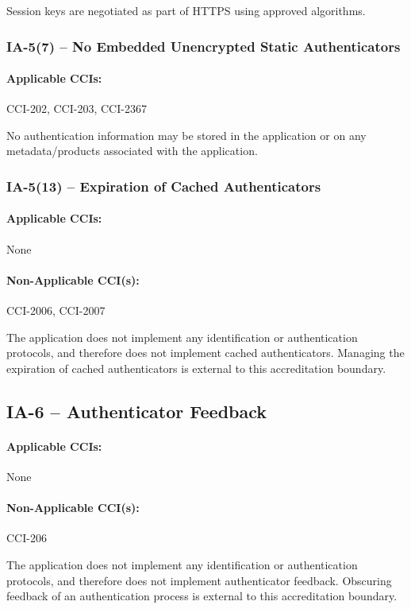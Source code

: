 \documentclass[letterpaper, 10pt, twoside]{article}
\begin{document}
Session keys are negotiated as part of HTTPS using approved algorithms.

\subsubsection{IA-5(7) -- No Embedded Unencrypted Static Authenticators}

\paragraph{Applicable CCIs:} CCI-202, CCI-203, CCI-2367

No authentication information may be stored in the application or on any metadata/products associated with the application.

\subsubsection{IA-5(13) -- Expiration of Cached Authenticators}

\paragraph{Applicable CCIs:} None

\paragraph{Non-Applicable CCI(s):} CCI-2006, CCI-2007

The application does not implement any identification or authentication protocols, and therefore does not implement cached authenticators. Managing the expiration of cached authenticators is external to this accreditation boundary.

\subsection{IA-6 -- Authenticator Feedback}

\paragraph{Applicable CCIs:} None

\paragraph{Non-Applicable CCI(s):} CCI-206

The application does not implement any identification or authentication protocols, and therefore does not implement authenticator feedback. Obscuring feedback of an authentication process is external to this accreditation boundary.
\end{document}
